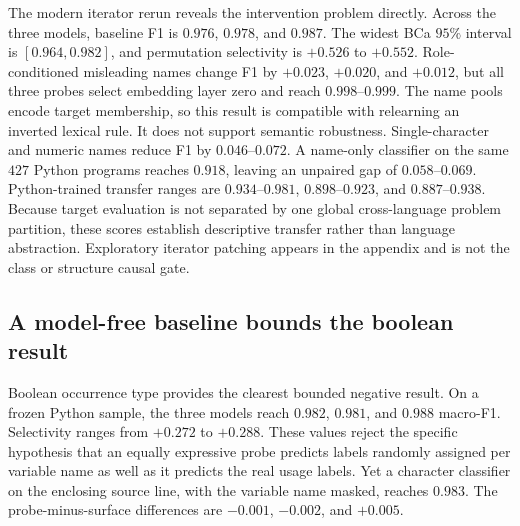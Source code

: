 \documentclass{article}
\begin{document}
The modern iterator rerun reveals the intervention problem directly. Across
the three models,
baseline F1 is $0.976$, $0.978$, and $0.987$. The widest BCa $95\%$ interval
is $[0.964,0.982]$, and permutation selectivity is $+0.526$ to $+0.552$.
Role-conditioned misleading names change F1 by $+0.023$, $+0.020$, and
$+0.012$, but all three probes select embedding layer zero and reach
$0.998$--$0.999$. The name pools encode target membership, so this result is
compatible with relearning an inverted lexical rule. It does not support
semantic robustness. Single-character and numeric names reduce F1 by
$0.046$--$0.072$. A name-only classifier on the same $427$ Python programs
reaches $0.918$, leaving an unpaired gap of $0.058$--$0.069$.
Python-trained transfer ranges are $0.934$--$0.981$, $0.898$--$0.923$, and
$0.887$--$0.938$. Because target evaluation is not separated by one global
cross-language problem partition, these scores establish descriptive transfer
rather than language abstraction. Exploratory iterator patching appears in the
appendix and is not the class or structure causal gate.

\subsection{A model-free baseline bounds the boolean result}

Boolean occurrence type provides the clearest bounded negative result. On a
frozen Python sample, the three models reach
$0.982$, $0.981$, and $0.988$ macro-F1. Selectivity ranges from $+0.272$ to
$+0.288$. These values reject the specific hypothesis that an equally
expressive probe predicts labels randomly assigned per variable name as well
as it predicts the real usage labels. Yet a character classifier on
the enclosing source line, with the variable name masked, reaches $0.983$.
The probe-minus-surface differences are $-0.001$, $-0.002$, and $+0.005$.
\end{document}
